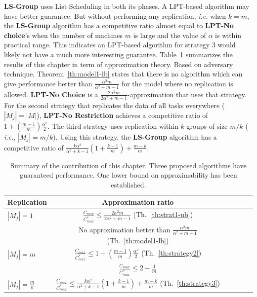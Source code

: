  \textbf{LS-Group} uses List Scheduling in both its phases. A LPT-based
 algorithm may have better guarantee. But without performing any
 replication, {\em i.e.} when $k=m$, the \textbf{LS-Group} algorithm
 has a competitive ratio almost equal to \textbf{LPT-No choice}'s when
 the number of machines $m$ is large and the value of $\alpha$ is
 within practical range. This indicates an LPT-based algorithm for
 strategy 3 would likely not have a much more interesting guarantee.
  Table~\ref{tab:template} summarizes the results of this chapter in term
  of approximation theory. Based on adversary technique,
  Theorem~\ref{th:model1-lb} states that there is no algorithm which can
  give performance better than $\frac{\alpha^{2}m }{\alpha^{2} + m-1}$ for the model where no
  replication is allowed. {\bf LPT-No Choice} is a
  $\frac{2\alpha^{2}m}{2\alpha^{2}+ m-1}$-approximation that uses that
  strategy. For the second strategy that replicates the data of all
  tasks everywhere ( $|M_j| = |M|$), {\bf LPT-No Restriction} achieves a
  competitive ratio of $1 + (\frac{m-1}{m})\frac{\alpha^{2}}{2}$.  The
  third strategy uses replication within $k$ groups of size $m/k$ ({\em
    i.e.}, $|M_j| = m/k$). Using this strategy, the {\bf LS-Group}
  algorithm has a competitive ratio of
  $\frac{k\alpha^{2}}{\alpha^{2}+k-1}\left( 1+ {\frac{k-1}{m}} \right) +
  {\frac{m-k}{m}}$.\\
  
  
  
  \begin{table}[ht]
    \centering
    \begin{tabular}{|l|c|c|c|c|c|}
      \hline
      Replication & Approximation ratio  \\
      \hline
      $|M_j|=1$ & $\frac{C_{max}}{C_{max}^{*}}\leq \frac{2\alpha^{2}m}{2\alpha^{2}+ m-1}$ (Th.~\ref{th:strat1-ub})  \\
      & No approximation better than $\frac{\alpha^{2}m }{\alpha^{2} + m-1}$ (Th.~\ref{th:model1-lb})   \\
      
      \hline
      $|M_j|=m$ & $\frac{C_{max}}{C_{max}^{*}} \leq 1 + (\frac{m-1}{m})\frac{\alpha^{2}}{2}$ (Th.~\ref{th:strategy2})  \\
      & $\frac{C_{max}}{C_{max}^{*}} \leq 2-\frac{1}{m}$ \cite{Graham66}   \\
      \hline
      
      $|M_j|= \frac{m}{k} $ & $\frac{C_{max}}{C_{max}^{*}} \leq \frac{k\alpha^{2}}{\alpha^{2}+k-1} \left(1+ {\frac{k-1}{m}} \right)+ {\frac{m-k}{m}}$ (Th.~\ref{th:strategy3})  \\
      
      \hline
    \end{tabular}
    \caption{Summary of the contribution of this chapter.
      Three proposed algorithms have guaranteed performance.
      One lower bound on approximability has been established.}
    \label{tab:template}
  \end{table}
  
